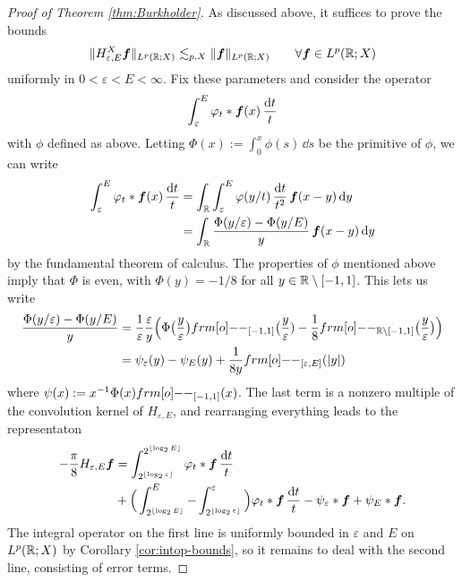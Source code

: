 {\begin{proof}[Proof of Theorem \ref{thm:Burkholder}]
  As discussed above, it suffices to prove the bounds
  \begin{equation}\label{eq:HT-unifbds}
    \|H^{X}_{\varepsilon, E} \bm{f}\|_{L^p(\mathbb{R};X)} \lesssim_{p,X} \|\bm{f}\|_{L^p(\mathbb{R};X)} \qquad \forall \bm{f} \in L^p(\mathbb{R};X)
  \end{equation}
  uniformly in $0 < \varepsilon < E < \infty$.
  Fix these parameters and consider the operator
  \begin{equation*}
    \int_{\varepsilon}^{E} \varphi_{t} \ast \bm{f}(x) \, \frac{\mathrm{d} t}{t}
  \end{equation*}
  with $\phi$ defined as above.
  Letting $\Phi(x) := \int_{0}^{x} \phi(s) \, \dd s$ be the primitive of $\phi$, we can write
  \begin{equation*}
    \begin{aligned}
    \int_{\varepsilon}^{E} \varphi_{t} \ast \bm{f}(x) \, \frac{\mathrm{d} t}{t}
    &= \int_{\mathbb{R}} \int_{\varepsilon}^{E} \varphi(y/t) \, \frac{\mathrm{d} t}{t^{2}} \, \bm{f}(x - y) \, \mathrm{d} y \\
    &= \int_{\mathbb{R}} \frac{\Phi(y/\varepsilon) - \Phi(y/E) }{y} \, \bm{f}(x-y) \, \mathrm{d} y
  \end{aligned}
\end{equation*}
by the fundamental theorem of calculus.
The properties of $\phi$ mentioned above imply that $\Phi$ is even, with $\Phi(y) = -1/8$ for all $y \in \mathbb{R} \setminus [-1,1]$.
This lets us write
\begin{equation*}
  \begin{aligned}
    \frac{\Phi(y/\varepsilon) - \Phi(y/E) }{y}
    &= \frac{1}{\varepsilon} \frac{\varepsilon}{y} \Big( \Phi\big(\frac{y}{\varepsilon}\big) \1_{[-1,1]}\big(\frac{y}{\varepsilon}) - \frac{1}{8}\1_{\R \sm [-1,1]}\big(\frac{y}{\varepsilon}\big) \Big) \\
    &= \psi_{\varepsilon}(y) - \psi_{E}(y) + \frac{1}{8y}\1_{[\varepsilon, E]}(|y|)
  \end{aligned}
\end{equation*}
where $\psi(x) := x^{-1} \Phi(x) \1_{[-1,1]}(x)$.
The last term is a nonzero multiple of the convolution kernel of $H_{\varepsilon, E}$, and rearranging everything leads to the representaton
\begin{equation*}
  \begin{aligned}
  -\frac{\pi}{8} H_{\varepsilon, E}\bm{f}
  &= \int_{2^{\lfloor \log_{2} \varepsilon \rfloor}}^{2^{\lfloor \log_{2} E \rfloor}} \varphi_{t} \ast \bm{f} \, \frac{\mathrm{d} t}{t} \\
  &+ \Big( \int_{2^{\lfloor \log_{2} E \rfloor}}^{E} - \int_{2^{\lfloor \log_{2} \varepsilon \rfloor}}^{\varepsilon} \Big) \varphi_{t} \ast \bm{f} \, \frac{\mathrm{d} t}{t} - \psi_{\varepsilon} \ast \bm{f} + \psi_{E} \ast \bm{f}.
\end{aligned}
\end{equation*}
The integral operator on the first line is uniformly bounded in $\varepsilon$ and $E$ on $L^p(\mathbb{R};X)$ by Corollary \ref{cor:intop-bounds}, so it remains to deal with the second line, consisting of error terms.


\end{proof}}
